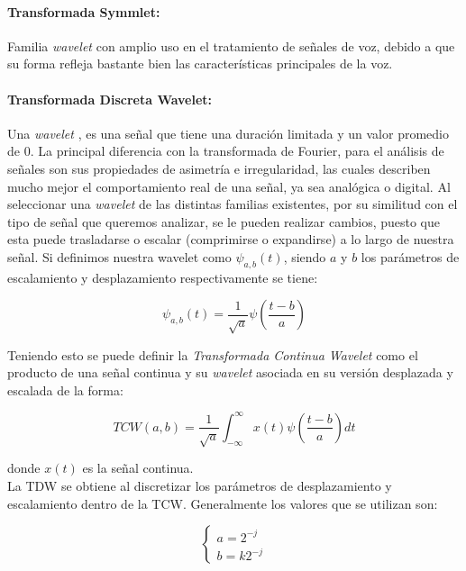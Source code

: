 \documentclass[11pt]{article}
\begin{document}
\paragraph*{Transformada Symmlet:}
Familia {\it wavelet} con amplio uso en el tratamiento de señales de voz, debido a que su forma refleja bastante bien las características principales de la voz.

\paragraph*{Transformada Discreta Wavelet:}
Una {\it wavelet} \cite{wavelet}, es una señal que tiene una duración limitada y un valor promedio de 0. La principal diferencia con la transformada de Fourier, para el análisis de señales son sus propiedades de asimetría e irregularidad, las cuales describen 
mucho mejor el comportamiento real de una señal, ya sea analógica o digital. Al seleccionar una {\it wavelet} de las distintas familias existentes, por su similitud con el tipo de señal que queremos analizar, se le pueden realizar cambios, puesto que esta puede trasladarse 
o escalar (comprimirse o expandirse) a lo largo de nuestra señal. Si definimos nuestra wavelet como \(\psi_{a, b}(t)\), siendo \(a\) y \(b\) los parámetros de escalamiento y desplazamiento respectivamente se tiene:

\begin{equation*}
    \psi_{a,b}(t) = \frac{1}{\sqrt{a}}\psi(\frac{t - b}{a})
\end{equation*}

Teniendo esto se puede definir la {\it Transformada Continua Wavelet} como el producto de una señal continua y su {\it wavelet} asociada en su versión desplazada y escalada de la forma:

\begin{equation*}
    TCW(a, b) = \frac{1}{\sqrt{a}}\int_{-\infty}^{\infty}x(t)\psi(\frac{t - b}{a})dt
\end{equation*}

donde \(x(t)\) es la señal continua.\\
La TDW se obtiene al discretizar los parámetros de desplazamiento y escalamiento dentro de la TCW. Generalmente los valores que se utilizan son:

\begin{equation*}
    \begin{cases}
        a=2^{-j}\\
        b=k2^{-j}
    \end{cases}
\end{equation*}
\end{document}
